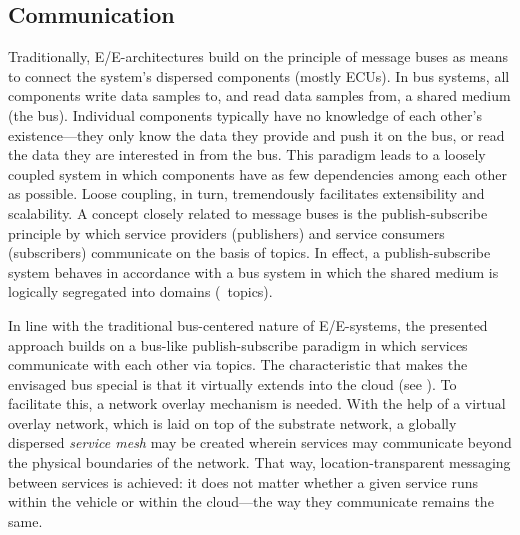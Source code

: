 \subsection{Communication}
Traditionally, E/E-architectures build on the principle of message buses as means to connect the system's dispersed components (mostly ECUs). In bus systems, all components write data samples to, and read data samples from, a shared medium (the bus). Individual components typically have no knowledge of each other's existence---they only know the data they provide and push it on the bus, or read the data they are interested in from the bus. This paradigm leads to a loosely coupled system in which components have as few dependencies among each other as possible. Loose coupling, in turn, tremendously facilitates extensibility and scalability. A concept closely related to message buses is the publish-subscribe principle by which service providers (publishers) and service consumers (subscribers) communicate on the basis of topics. In effect, a publish-subscribe system behaves in accordance with a bus system in which the shared medium is logically segregated into domains (\ie\ topics).

In line with the traditional bus-centered nature of E/E-systems, the presented approach builds on a bus-like publish-subscribe paradigm in which services communicate with each other via topics. The characteristic that makes the envisaged bus special is that it virtually extends into the cloud (see ). To facilitate this, a network overlay mechanism \cite{tarkoma2010overlay} is needed. With the help of a virtual overlay network, which is laid on top of the substrate network, a globally dispersed \emph{service mesh} may be created wherein services may communicate beyond the physical boundaries of the network. That way, location-transparent messaging between services is achieved: it does not matter whether a given service runs within the vehicle or within the cloud---the way they communicate remains the same.





